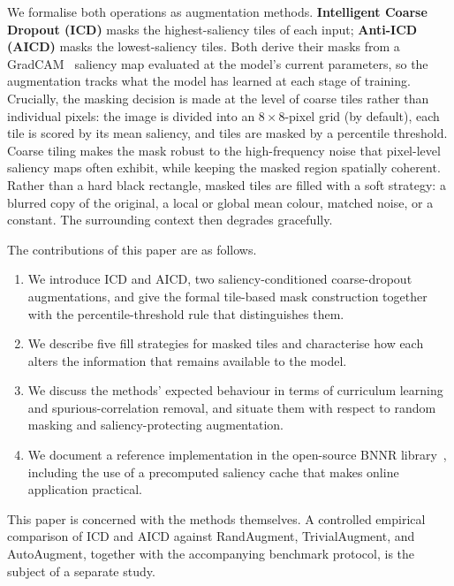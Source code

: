 We formalise both operations as augmentation methods.  \textbf{Intelligent
Coarse Dropout (ICD)} masks the highest-saliency tiles of each input;
\textbf{Anti-ICD (AICD)} masks the lowest-saliency tiles.  Both derive their
masks from a GradCAM~\citep{selvaraju2017gradcam} saliency map evaluated at the
model's current parameters, so the augmentation tracks what the model has
learned at each stage of training.  Crucially, the masking decision is made at
the level of coarse tiles rather than individual pixels: the image is divided
into an $8\times 8$-pixel grid (by default), each tile is scored by its mean
saliency, and tiles are masked by a percentile threshold.  Coarse tiling makes
the mask robust to the high-frequency noise that pixel-level saliency maps
often exhibit, while keeping the masked region spatially coherent.  Rather than
a hard black rectangle, masked tiles are filled with a soft strategy: a blurred
copy of the original, a local or global mean colour, matched noise, or a
constant.  The surrounding context then degrades gracefully.

The contributions of this paper are as follows.
\begin{enumerate}
  \item We introduce ICD and AICD, two saliency-conditioned coarse-dropout
    augmentations, and give the formal tile-based mask construction together
    with the percentile-threshold rule that distinguishes them.
  \item We describe five fill strategies for masked tiles and characterise how
    each alters the information that remains available to the model.
  \item We discuss the methods' expected behaviour in terms of curriculum
    learning and spurious-correlation removal, and situate them with respect to
    random masking and saliency-protecting augmentation.
  \item We document a reference implementation in the open-source BNNR
    library~\citep{walo2026bnnr}, including the use of a precomputed saliency
    cache that makes online application practical.
\end{enumerate}

This paper is concerned with the methods themselves.  A controlled empirical
comparison of ICD and AICD against RandAugment, TrivialAugment, and AutoAugment,
together with the accompanying benchmark protocol, is the subject of a separate
study.
